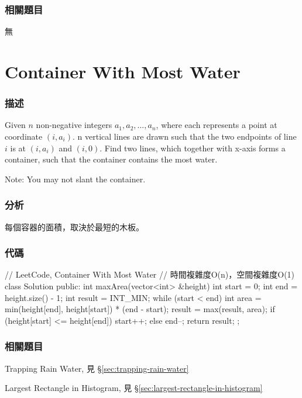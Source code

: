 \subsubsection{相關題目}
\begindot
\item 無
\myenddot


\section{Container With Most Water}
\label{sec:container-with-most-water}


\subsubsection{描述}
Given $n$ non-negative integers $a_1, a_2, ..., a_n$, where each represents a point at coordinate $(i, a_i)$. n vertical lines are drawn such that the two endpoints of line $i$ is at $(i, a_i)$ and $(i, 0)$. Find two lines, which together with x-axis forms a container, such that the container contains the most water.

Note: You may not slant the container.


\subsubsection{分析}
每個容器的面積，取決於最短的木板。


\subsubsection{代碼}
\begin{Code}
// LeetCode, Container With Most Water
// 時間複雜度O(n)，空間複雜度O(1)
class Solution {
public:
    int maxArea(vector<int> &height) {
        int start = 0;
        int end = height.size() - 1;
        int result = INT_MIN;
        while (start < end) {
            int area = min(height[end], height[start]) * (end - start);
            result = max(result, area);
            if (height[start] <= height[end]) {
                start++;
            } else {
                end--;
            }
        }
        return result;
    }
};
\end{Code}


\subsubsection{相關題目}
\begindot
\item Trapping Rain Water, 見 \S \ref{sec:trapping-rain-water}
\item Largest Rectangle in Histogram, 見 \S \ref{sec:largest-rectangle-in-histogram}
\myenddot
